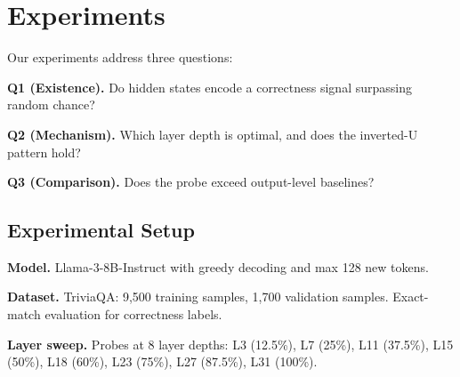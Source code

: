 \section{Experiments}

Our experiments address three questions:

\textbf{Q1 (Existence).} Do hidden states encode a correctness signal surpassing random chance?

\textbf{Q2 (Mechanism).} Which layer depth is optimal, and does the inverted-U pattern hold?

\textbf{Q3 (Comparison).} Does the probe exceed output-level baselines?

\subsection{Experimental Setup}

\textbf{Model.} Llama-3-8B-Instruct with greedy decoding and max 128 new tokens.

\textbf{Dataset.} TriviaQA: 9,500 training samples, 1,700 validation samples. Exact-match evaluation for correctness labels.

\textbf{Layer sweep.} Probes at 8 layer depths: L3 (12.5\%), L7 (25\%), L11 (37.5\%), L15 (50\%), L18 (60\%), L23 (75\%), L27 (87.5\%), L31 (100\%).
